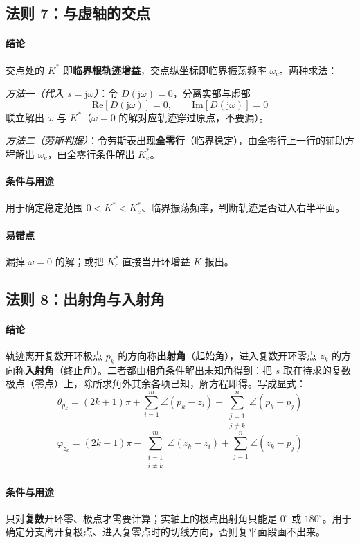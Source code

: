 \subsection{法则 7：与虚轴的交点}
\paragraph{结论}交点处的 $K^*$ 即\textbf{临界根轨迹增益}，交点纵坐标即临界振荡频率 $\omega_c$。两种求法：

\emph{方法一（代入 $s=\mathrm{j}\omega$）}：令 $D(\mathrm{j}\omega)=0$，分离实部与虚部
\[
\mathrm{Re}\left[D(\mathrm{j}\omega)\right]=0,
\qquad
\mathrm{Im}\left[D(\mathrm{j}\omega)\right]=0
\]
联立解出 $\omega$ 与 $K^*$（$\omega=0$ 的解对应轨迹穿过原点，不要漏）。

\emph{方法二（劳斯判据）}：令劳斯表出现\textbf{全零行}（临界稳定），由全零行上一行的辅助方程解出 $\omega_c$，由全零行条件解出 $K^*_c$。

\paragraph{条件与用途}用于确定稳定范围 $0<K^*<K^*_c$、临界振荡频率，判断轨迹是否进入右半平面。

\paragraph{易错点}漏掉 $\omega=0$ 的解；或把 $K^*_c$ 直接当开环增益 $K$ 报出。

\subsection{法则 8：出射角与入射角}
\paragraph{结论}轨迹离开复数开环极点 $p_k$ 的方向称\textbf{出射角}（起始角），进入复数开环零点 $z_k$ 的方向称\textbf{入射角}（终止角）。二者都由相角条件解出未知角得到：把 $s$ 取在待求的复数极点（零点）上，除所求角外其余各项已知，解方程即得。写成显式：
\[
\theta_{p_k}=(2k+1)\pi+\sum_{i=1}^{m}\angle(p_k-z_i)-\sum_{\substack{j=1\\ j\neq k}}^{n}\angle(p_k-p_j)
\]
\[
\varphi_{z_k}=(2k+1)\pi-\sum_{\substack{i=1\\ i\neq k}}^{m}\angle(z_k-z_i)+\sum_{j=1}^{n}\angle(z_k-p_j)
\]

\paragraph{条件与用途}只对\textbf{复数}开环零、极点才需要计算；实轴上的极点出射角只能是 $0^\circ$ 或 $180^\circ$。用于确定分支离开复极点、进入复零点时的切线方向，否则复平面段画不出来。

